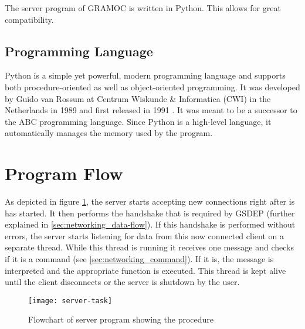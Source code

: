 The server program of GRAMOC is written in Python. This allows for great compatibility.

\subsection{Programming Language}

Python is a simple yet powerful, modern programming language and supports both procedure-oriented as well as object-oriented programming. It was developed by Guido van Rossum at Centrum Wiskunde \& Informatica (CWI) in the Netherlands in 1989 and first released in 1991 \cite{HistoryOfPython}. It was meant to be a successor to the ABC programming language. Since Python is a high-level language, it automatically manages the memory used by the program.

\section{Program Flow}

As depicted in figure \ref{fig:server-program-flow}, the server starts accepting new connections right after is has started. It then performs the handshake that is required by GSDEP (further explained in \ref{sec:networking_data-flow}). If this handshake is performed without errors, the server starts listening for data from this now connected client on a separate thread. While this thread is running it receives one message and checks if it is a command (see \ref{sec:networking_command}). If it is, the message is interpreted and the appropriate function is executed. This thread is kept alive until the client disconnects or the server is shutdown by the user.

\begin{figure}[H]
	\centering
	\texttt{[image: server-task]}
	\caption{Flowchart of server program showing the procedure}
	\label{fig:server-program-flow}
\end{figure}
